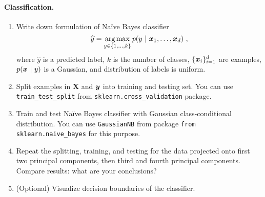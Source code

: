 \documentclass{article}
\begin{document}
\paragraph{Classification.}
\begin{enumerate}
\item Write down formulation of Na\"{i}ve Bayes classifier
\[
\widehat{y} = \operatorname*{arg\,max}_{y \in \{1, \ldots, k\}} p(y \ | \ \boldsymbol{x}_1, \ldots, \boldsymbol{x}_d)~,
\]
where $\widehat{y}$ is a predicted label, $k$ is the number of classes, $\{\boldsymbol{x}_i\}_{i=1}^d$ are examples,
$p(\boldsymbol{x} \ | \ y)$ is a Gaussian, and distribution of labels is uniform.
\item Split examples in $\boldsymbol{X}$ and $\boldsymbol{y}$ into training and testing set.
You can use \verb!train_test_split! from \verb!sklearn.cross_validation! package.
\item Train and test Na\"{i}ve Bayes classifier with Gaussian class-conditional distribution. You can use \verb!GaussianNB! from package \verb!from sklearn.naive_bayes! for this purpose.
\item Repeat the splitting, training, and testing for the data projected onto first two principal components,
then third and fourth principal components. Compare results: what are your conclusions?
\item (Optional) Visualize decision boundaries of the classifier.
\end{enumerate}



\end{document}
